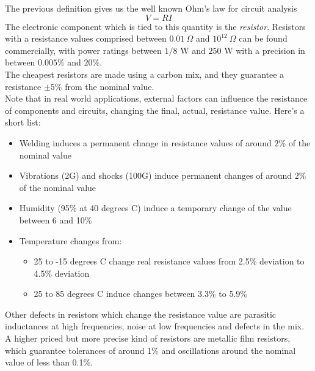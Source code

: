 \documentclass[../electromagnetism.tex]{subfiles}
\begin{document}
The previous definition gives us the well known Ohm's law for circuit analysis
\begin{equation}
	V=RI
	\label{eq:ohmcircuits.dc}
\end{equation}
The electronic component which is tied to this quantity is the \textit{resistor}. Resistors with a resistance values comprised between $0.01\ \Omega$ and $10^{12}\ \Omega$ can be found commercially, with power ratings between $1/8$ W and $250$ W with a precision in between $0.005\%$ and $20\%$.\\
The cheapest resistors are made using a carbon mix, and they guarantee a resistance $\pm5\%$ from the nominal value.\\
Note that in real world applications, external factors can influence the resistance of components and circuits, changing the final, actual, resistance value. Here's a short list:
\begin{itemize}
\item Welding induces a permanent change in resistance values of around $2\%$ of the nominal value
\item Vibrations (2G) and shocks (100G) induce permanent changes of around $2\%$ of the nominal value
\item Humidity (95\% at 40 degrees C) induce a temporary change of the value between 6 and 10\%
\item Temperature changes from:
	\begin{itemize}
	\item 25 to -15 degrees C change real resistance values from 2.5\% deviation to 4.5\% deviation
	\item 25 to 85 degrees C induce changes between 3.3\% to 5.9\%
	\end{itemize}
\end{itemize}
Other defects in resistors which change the resistance value are parasitic inductances at high frequencies, noise at low frequencies and defects in the mix.\\
A higher priced but more precise kind of resistors are metallic film resistors, which guarantee tolerances of around 1\% and oscillations around the nominal value of less than 0.1\%.\\
\end{document}
